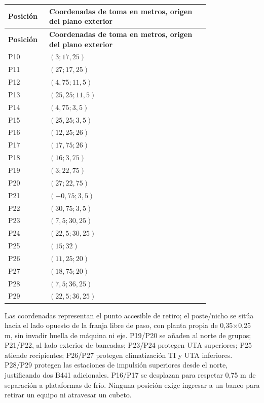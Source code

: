 \begin{longtable}{|p{0.12\linewidth}|p{0.67\linewidth}|}
\hline \textbf{Posición} & \textbf{Coordenadas de toma en metros, origen del plano exterior} \\\hline
\endfirsthead
\hline \textbf{Posición} & \textbf{Coordenadas de toma en metros, origen del plano exterior} \\\hline
\endhead
P10 & $(3;17,25)$ \\\hline
P11 & $(27;17,25)$ \\\hline
P12 & $(4,75;11,5)$ \\\hline
P13 & $(25,25;11,5)$ \\\hline
P14 & $(4,75;3,5)$ \\\hline
P15 & $(25,25;3,5)$ \\\hline
P16 & $(12,25;26)$ \\\hline
P17 & $(17,75;26)$ \\\hline
P18 & $(16;3,75)$ \\\hline
P19 & $(3;22,75)$ \\\hline
P20 & $(27;22,75)$ \\\hline
P21 & $(-0,75;3,5)$ \\\hline
P22 & $(30,75;3,5)$ \\\hline
P23 & $(7,5;30,25)$ \\\hline
P24 & $(22,5;30,25)$ \\\hline
P25 & $(15;32)$ \\\hline
P26 & $(11,25;20)$ \\\hline
P27 & $(18,75;20)$ \\\hline
P28 & $(7,5;36,25)$ \\\hline
P29 & $(22,5;36,25)$ \\\hline
\end{longtable}
Las coordenadas representan el punto accesible de retiro; el poste/nicho se sitúa hacia el lado opuesto de la franja libre de paso, con planta propia de 0,35$\times$0,25 m, sin invadir huella de máquina ni eje. P19/P20 se añaden al norte de grupos; P21/P22, al lado exterior de bancadas; P23/P24 protegen UTA superiores; P25 atiende recipientes; P26/P27 protegen climatización TI y UTA inferiores. P28/P29 protegen las estaciones de impulsión superiores desde el norte, justificando dos B441 adicionales. P16/P17 se desplazan para respetar 0,75 m de separación a plataformas de frío. Ninguna posición exige ingresar a un banco para retirar un equipo ni atravesar un cubeto.

